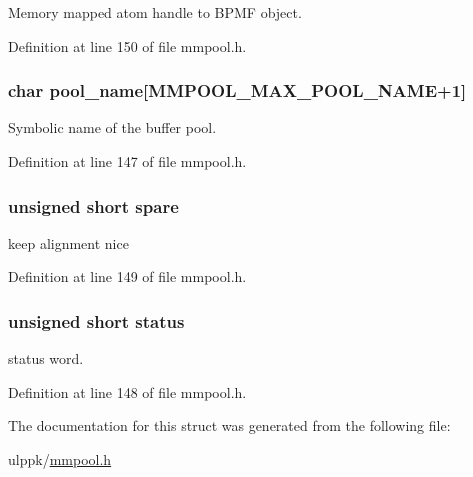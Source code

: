Memory mapped atom handle to B\-P\-M\-F object. 



Definition at line 150 of file mmpool.\-h.

\hypertarget{struct__bpmf__pool__handle_a74e3da7948675b5c73197ddde06dfe35}{
\subsubsection[{pool\-\_\-name}]{\setlength{\rightskip}{0pt plus 5cm}char pool\-\_\-name\mbox{[}{\bf M\-M\-P\-O\-O\-L\-\_\-\-M\-A\-X\-\_\-\-P\-O\-O\-L\-\_\-\-N\-A\-M\-E}+1\mbox{]}}}\label{struct__bpmf__pool__handle_a74e3da7948675b5c73197ddde06dfe35}


Symbolic name of the buffer pool. 



Definition at line 147 of file mmpool.\-h.

\hypertarget{struct__bpmf__pool__handle_a98efda18e7b0a66854cd9b0963832b1a}{
\subsubsection[{spare}]{\setlength{\rightskip}{0pt plus 5cm}unsigned short spare}}\label{struct__bpmf__pool__handle_a98efda18e7b0a66854cd9b0963832b1a}


keep alignment nice 



Definition at line 149 of file mmpool.\-h.

\hypertarget{struct__bpmf__pool__handle_a724f8cf1b8ff3d96c3a9cbcd2a6957a6}{
\subsubsection[{status}]{\setlength{\rightskip}{0pt plus 5cm}unsigned short status}}\label{struct__bpmf__pool__handle_a724f8cf1b8ff3d96c3a9cbcd2a6957a6}


status word. 



Definition at line 148 of file mmpool.\-h.



The documentation for this struct was generated from the following file\-:\begin{DoxyCompactItemize}
\item 
ulppk/\hyperlink{mmpool_8h}{mmpool.\-h}\end{DoxyCompactItemize}
